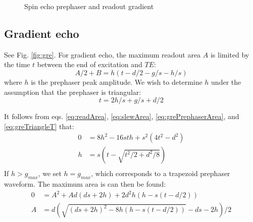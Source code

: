 \documentclass{article}
\begin{document}
\begin{figure}[h]
    \centering
    \caption{Spin echo prephaser and readout gradient}
    \label{fig:se}
\end{figure}

\subsection{Gradient echo}

See Fig. \ref{fig:gre}. 
For gradient echo, the maximum readout area $A$ is limited by the time $t$ between the end of excitation and $TE$:
\begin{equation}
    A/2 + B = h(t-d/2-g/s-h/s)
    \label{eq:grePrephaserArea}
\end{equation}
where $h$ is the prephaser peak amplitude. 
We wish to determine $h$ under the assumption that the prephaser is triangular:
\begin{equation}
    t = 2h/s+g/s+d/2
    \label{eq:greTriangleT}
\end{equation}

It follows from eqs. \ref{eq:readArea}, \ref{eq:slewArea}, \ref{eq:grePrephaserArea}, and \ref{eq:greTriangleT} that:
\begin{equation}
    \begin{split}
        0 & = 8h^2 - 16sth + s^2(4t^2-d^2) \\
        h & = s (t - \sqrt{t^2/2+d^2/8}) \\
    \end{split}
    \label{eq:GREprephaserAmp}
\end{equation}
If $h>g_{max}$, we set $h=g_{max}$, which corresponds to a trapezoid prephaser waveform. 
The maximum area is can then be found:
\begin{equation}
    \begin{split}
        0 & = A^2 + Ad(ds+2h) + 2d^2h(h-s(t-d/2)) \\
        A & = d(\sqrt{(ds+2h)^2-8h(h-s(t-d/2))} - ds - 2h)/2
    \end{split}
    \label{eq:greArea}
\end{equation}
\end{document}
